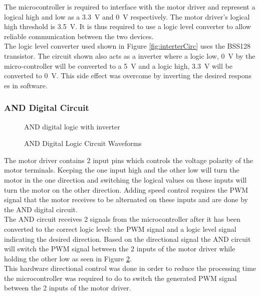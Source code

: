  
 The microcontroller is required to interface with the motor driver and represent a logical high and low as a \SI{3.3}{V} and \SI{0}{V} respectively. The motor driver's logical high threshold is \SI{3.5}{V}. It is thus required to use a logic level converter to allow reliable communication between the two devices.\\
 
 The logic level converter used shown in Figure \ref{fig:interterCirc} uses the BSS128 transistor. The circuit shown also acts as a inverter where a logic low, \SI{0}{V} by the micro-controller will be converted to a \SI{5}{V} and a logic high, \SI{3.3}{V} will be converted to \SI{0}{V}. This side effect was overcome by inverting the desired respons	es in software.
 
 
 \subsubsection{AND Digital Circuit}
 \begin{figure}[h]
 	\centering
 	
 	\caption{AND digital logic with inverter}
 	\label{fig:andCircuit}
 \end{figure}
 
 \begin{figure}[h]
 	\centering
 	
 	\caption{AND Digital Logic Circuit Waveforms}
 	\label{fig:andCircuit_waveform}
 \end{figure}
 
 The motor driver contains 2 input pins which controls the voltage polarity of the motor terminals. Keeping the one input high and the other low will turn the motor in the one direction and switching the logical values on these inputs will turn the motor on the other direction. Adding speed control requires the PWM signal that the motor receives to be alternated on these inputs and are done by the AND digital circuit.\\
 
 The AND circuit receives 2 signals from the microcontroller  after it has been converted to the correct logic level: the PWM signal and a logic level signal indicating the desired direction. Based on the directional signal the AND circuit will switch the PWM signal between the 2 inputs of the motor driver while holding the other low as seen in Figure \ref{fig:andCircuit_waveform}.\\
 
 This hardware directional control was done in order to reduce the processing time the microcontroller was required to do to switch the generated PWM signal between the 2 inputs of the motor driver.

